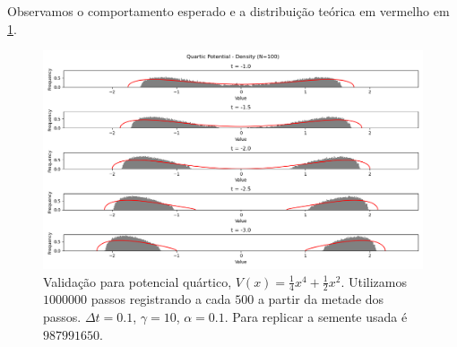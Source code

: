 Observamos o comportamento esperado e a distribuição teórica em vermelho em \ref{fig: quartic}. 


\begin{figure}[ht!]
	\centering
		\includegraphics[scale=0.5]{Assets/validationArticleQuartic}
		\caption{Validação para potencial quártico, $V(x) = \frac{1}{4} x^4 + \frac{1}{2} x^2$. Utilizamos $1000000$ passos registrando a cada $500$ a partir da metade dos passos. $\Delta t = 0.1$, $\gamma = 10$, $\alpha = 0.1$. Para replicar a semente usada é $987991650$.}
		\label{fig: quartic}
\end{figure}

